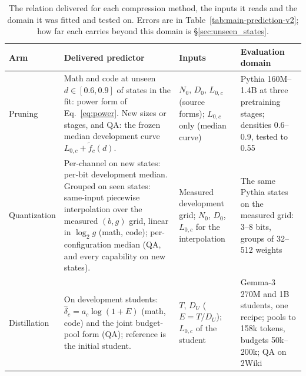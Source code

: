\begin{table}[t]
\centering\scriptsize\setlength{\tabcolsep}{3pt}\renewcommand{\arraystretch}{1.05}
\begin{tabular}{@{}>{\raggedright\arraybackslash}p{1.5cm}>{\raggedright\arraybackslash}p{5.6cm}>{\raggedright\arraybackslash}p{3.3cm}>{\raggedright\arraybackslash}p{3.4cm}@{}}
\toprule
Arm & Delivered predictor & Inputs & Evaluation domain \\
\midrule
Pruning & Math and code at unseen $d\in[0.6,0.9]$ of states in the fit: power form of Eq.~\ref{eq:power}. New sizes or stages, and QA: the frozen median development curve $L_{0,c}+\widetilde f_c(d)$. & $N_0$, $D_0$, $L_{0,c}$ (source forms); $L_{0,c}$ only (median curve) & Pythia 160M--1.4B at three pretraining stages; densities 0.6--0.9, tested to 0.55 \\
\addlinespace
Quantization & Per-channel on new states: per-bit development median. Grouped on seen states: same-input piecewise interpolation over the measured $(b,g)$ grid, linear in $\log_2 g$ (math, code); per-configuration median (QA, and every capability on new states). & Measured development grid; $N_0$, $D_0$, $L_{0,c}$ for the interpolation & The same Pythia states on the measured grid: 3--8 bits, groups of 32--512 weights \\
\addlinespace
Distillation & On development students: $\widehat\delta_c=a_c\log(1+E)$ (math, code) and the joint budget-pool form (QA); reference is the initial student. & $T$, $D_U$ ($E=T/D_U$); $L_{0,c}$ of the student & Gemma-3 270M and 1B students, one recipe; pools to 158k tokens, budgets 50k--200k; QA on 2Wiki \\
\bottomrule
\end{tabular}
\caption{The relation delivered for each compression method, the inputs it reads and the domain it was fitted and tested on. Errors are in Table~\ref{tab:main-prediction-v2}; how far each carries beyond this domain is \S\ref{sec:unseen_states}.}
\label{tab:final}
\end{table}
